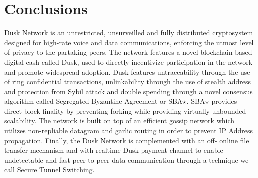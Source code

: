 \section{Conclusions}

\textrm{Dusk} Network is an unrestricted, unsurveilled and fully distributed cryptosystem designed for high-rate voice and data communications, enforcing the utmost level of privacy to the partaking peers. The network features a novel blockchain-based digital cash called \textrm{Dusk}, used to directly incentivize participation in the network and promote widespread adoption. \textrm{Dusk} features untraceability through the use of ring confidential transactions, unlinkability through the use of stealth address and protection from Sybil attack and double spending through a novel consensus algorithm called Segregated Byzantine Agreement or SBA$\large\star$. SBA$\large\star$ provides direct block finality by preventing forking while providing virtually unbounded scalability. The network is built on top of an efficient gossip network which utilizes non-repliable datagram and garlic routing in order to prevent IP Address propagation. Finally, the \textrm{Dusk} Network is complemented with an off- online file transfer mechanism and with realtime \textrm{Dusk} payment channel to enable undetectable and fast peer-to-peer data communication through a technique we call Secure Tunnel Switching.